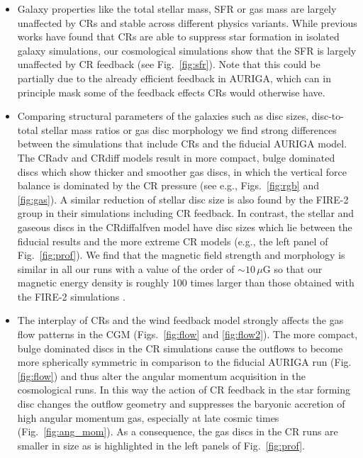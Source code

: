 \documentclass[useAMS,usenatbib]{mnras}
\begin{document}
\begin{itemize}
\item Galaxy properties like the total stellar mass, SFR or gas mass are largely unaffected by CRs and stable across different physics variants. While previous works have found that CRs are able to suppress star formation in isolated galaxy simulations, our cosmological simulations show that the SFR is largely unaffected by CR feedback (see Fig.\ \ref{fig:sfr}). Note that this could be partially due to the already efficient feedback in AURIGA, which can in principle mask some of the feedback effects CRs would otherwise have.

\item Comparing structural parameters of the galaxies such as disc sizes, disc-to-total stellar mass ratios or gas disc morphology we find strong differences between the simulations that include CRs and the fiducial AURIGA model. The CRadv and CRdiff models result in more compact, bulge dominated discs which show thicker and smoother gas discs, in which the vertical force balance is dominated by the CR pressure (see e.g., Figs.\ \ref{fig:rgb} and \ref{fig:gas}). A similar reduction of stellar disc size is also found by the FIRE-2 group in their simulations including CR feedback. In contrast, the stellar and gaseous discs in the CRdiffalfven model have disc sizes which lie between the fiducial results and the more extreme CR models (e.g., the left panel of Fig.\ \ref{fig:prof}). We find that the magnetic field strength and morphology is similar in all our runs with a value of the order of $\sim10\, \mu$G \citep[that is consistent with MW observations, see][]{Pakmor2018} so that our magnetic energy density is roughly 100 times larger than those obtained with the FIRE-2 simulations \citep[e.g. Figs. 3 and 19 of][]{Hopkins2019}.

\item The interplay of CRs and the wind feedback model strongly affects the gas flow patterns in the CGM (Figs.\ \ref{fig:flow} and \ref{fig:flow2}). The more compact, bulge dominated discs in the CR simulations cause the outflows to become more spherically symmetric in comparison to the fiducial AURIGA run (Fig. \ref{fig:flow}) and thus alter the angular momentum acquisition in the cosmological runs. In this way the action of CR feedback in the star forming disc changes the outflow geometry and suppresses the baryonic accretion of high angular momentum gas, especially at late cosmic times (Fig.\ \ref{fig:ang_mom}). As a consequence, the gas discs in the CR runs are smaller in size as is highlighted in the left panels of Fig.\ \ref{fig:prof}.


\end{itemize}
\end{document}
